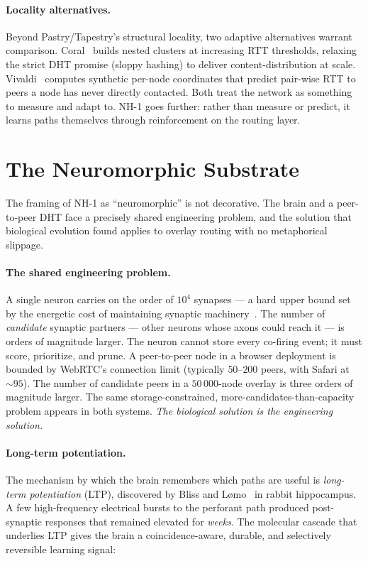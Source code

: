 \documentclass[conference]{IEEEtran}
\newcommand{\nhone}{NH-1\xspace}
\begin{document}
\paragraph{Locality alternatives.}
Beyond Pastry/Tapestry's structural locality, two adaptive alternatives
warrant comparison. Coral~\cite{freedman2004coral} builds nested clusters
at increasing RTT thresholds, relaxing the strict DHT promise (sloppy
hashing) to deliver content-distribution at scale.
Vivaldi~\cite{dabek2004vivaldi} computes synthetic per-node coordinates
that predict pair-wise RTT to peers a node has never directly contacted.
Both treat the network as something to measure and adapt to. \nhone
goes further: rather than measure or predict, it learns paths
themselves through reinforcement on the routing layer.

\section{The Neuromorphic Substrate}
\label{sec:substrate}

The framing of \nhone as ``neuromorphic'' is not decorative. The brain
and a peer-to-peer DHT face a precisely shared engineering problem,
and the solution that biological evolution found applies to
overlay routing with no metaphorical slippage.

\paragraph{The shared engineering problem.}
A single neuron carries on the order of $10^4$ synapses --- a hard upper
bound set by the energetic cost of maintaining synaptic
machinery~\cite{laughlin2003communication}. The number of \emph{candidate}
synaptic partners --- other neurons whose axons could reach it --- is
orders of magnitude larger. The neuron cannot store every co-firing event;
it must score, prioritize, and prune. A peer-to-peer node in a browser
deployment is bounded by WebRTC's connection limit (typically $50$--$200$
peers, with Safari at $\sim\!95$). The number of candidate peers in a
$50\,000$-node overlay is three orders of magnitude larger. The same
storage-constrained, more-candidates-than-capacity problem appears in
both systems. \emph{The biological solution is the engineering solution.}

\paragraph{Long-term potentiation.}
The mechanism by which the brain remembers which paths are useful is
\emph{long-term potentiation} (LTP), discovered by Bliss and
L\o{}mo~\cite{bliss1973long} in rabbit hippocampus. A few high-frequency
electrical bursts to the perforant path produced post-synaptic responses
that remained elevated for \emph{weeks}. The molecular cascade that
underlies LTP gives the brain a coincidence-aware, durable, and
selectively reversible learning signal:
\end{document}
